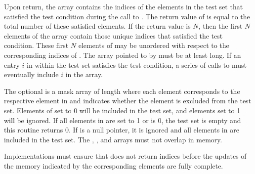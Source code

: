 \begin{apidefinition}
{    Upon return, the  array contains the indices of the elements
    in the test set that satisfied the test condition during the call to
    .  The return value of
     is equal to the total number of
    these satisfied elements.  If the return value is $N$, then the first $N$
    elements of the  array contain those unique indices that
    satisfied the test condition.  These first $N$ elements of 
    may be unordered with respect to the corresponding indices of .
    The array pointed to by  must be at least  long.
    If an entry $i$ in  within the test set satisfies the test
    condition, a series of calls to 
    must eventually include $i$ in the  array.

    The optional  is a mask array of length  where each element
    corresponds to the respective element in  and indicates whether
    the element is excluded from the test set.  Elements of  set to
    0 will be included in the test set, and elements set to 1 will be ignored.  If all
    elements in  are set to 1 or  is 0, the test set is
    empty and this routine returns 0.  If  is a null pointer, it is ignored and all
    elements in  are included in the test set.  The ,
    , and  arrays must not overlap in memory.

    Implementations must ensure that  does not
    return indices before the updates of the memory indicated by the
    corresponding  elements are fully complete.
}


\end{apidefinition}
